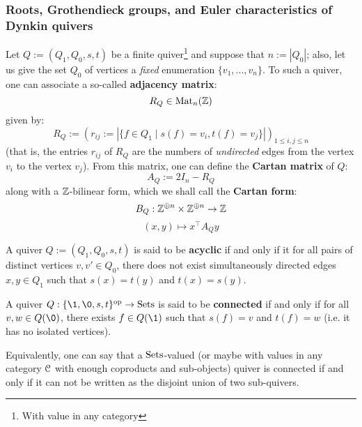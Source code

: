         \subsubsection{Roots, Grothendieck groups, and Euler characteristics of Dynkin quivers}
            \begin{definition} \label{def: cartan_quadratic_forms_of_finite_quivers}
                Let $Q := (Q_1, Q_0, s, t)$ be a finite quiver\footnote{With value in any category} and suppose that $n := |Q_0|$; also, let us give the set $Q_0$ of vertices a \textit{fixed} enumeration $\{v_1, ..., v_n\}$. To such a quiver, one can associate a so-called \textbf{adjacency matrix}:
                    $$R_Q \in \mathrm{Mat}_n(\mathbb{Z})$$
                given by:
                    $$R_Q := (r_{ij} := |\{f \in Q_1 \mid s(f) = v_i, t(f) = v_j\}|)_{1 \leq i, j \leq n}$$
                (that is, the entries $r_{ij}$ of $R_Q$ are the numbers of \textit{undirected} edges from the vertex $v_i$ to the vertex $v_j$). From this matrix, one can define the \textbf{Cartan matrix} of $Q$:
                    $$A_Q := 2I_n - R_Q$$
                along with a $\mathbb{Z}$-bilinear form, which we shall call the \textbf{Cartan form}:
                    $$B_Q: \Z^{\oplus n} \x \Z^{\oplus n} \to \Z$$
                    $$(x, y) \mapsto x^{\top} A_Q y$$                
            \end{definition}
            \begin{definition} \label{def: acyclic_quivers}
                A quiver $Q := (Q_1, Q_0, s, t)$ is said to be \textbf{acyclic} if and only if it for all pairs of distinct vertices $v, v' \in Q_0$, there does not exist simultaneously directed edges $x, y \in Q_1$ such that $s(x) = t(y)$ and $t(x) = s(y)$.
            \end{definition}
            \begin{definition} \label{def: connected_quivers}
                A quiver $Q: \{\1, \0, s, t\}^{\op} \to \Sets$ is said to be \textbf{connected} if and only if for all $v, w \in Q(\0)$, there exists $f \in Q(\1)$ such that $s(f) = v$ and $t(f) = w$ (i.e. it has no isolated vertices).
            \end{definition}
            \begin{remark}
                Equivalently, one can say that a $\mathrm{Sets}$-valued (or maybe with values in any category $\mathcal{C}$ with enough coproducts and sub-objects) quiver is connected if and only if it can not be written as the disjoint union of two sub-quivers. 
            \end{remark}
